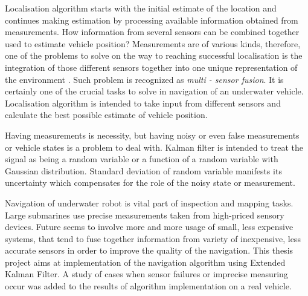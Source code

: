  Localisation algorithm starts with the initial estimate of the location and continues making estimation by processing available information obtained from measurements. How information from several sensors can be combined together used to estimate vehicle position? Measurements are of various kinds, therefore, one of the problems to solve on the way to reaching successful localisation is the integration of those different sensors together into one unique representation of the environment \cite{negenborn03}. Such problem is recognized as \textit{multi - sensor fusion}. It is certainly one of the crucial tasks to solve in navigation of an underwater vehicle. Localisation algorithm is intended to take input from different sensors and calculate the best possible estimate of vehicle position. 

Having measurements is necessity, but having noisy or even false measurements or vehicle states is a problem to deal with. Kalman filter is intended to treat the signal as being a random variable or a function of a random variable with Gaussian distribution. Standard deviation of random variable manifests its uncertainty which compensates for the role of the noisy state or measurement.

Navigation of underwater robot is vital part of inspection and mapping tasks. Large submarines use precise measurements taken from high-priced sensory devices. Future seems to involve more and more usage of small, less expensive systems, that tend to fuse together information from variety of inexpensive, less accurate sensors in order to improve the quality of the navigation. This thesis project aims at implementation of the navigation algorithm using Extended Kalman Filter. A study of cases when sensor failures or imprecise measuring occur was added to the results of algorithm implementation on a real vehicle.